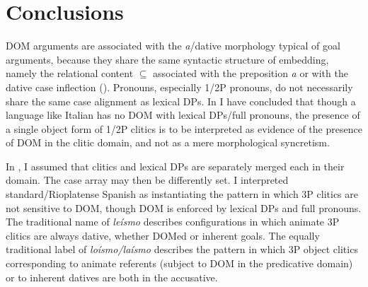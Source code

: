 \documentclass[output=paper,colorlinks,citecolor=brown,modfonts,nonflat]{langsci/langscibook}
\begin{document}
\section{Conclusions}\label{sec:manzini:4}
\largerpage[-1]
DOM arguments are associated with the \textit{a}/dative morphology typical of goal arguments, because they share the same syntactic structure of embedding, namely the relational content ${\subseteq}$ associated with the preposition \textit{a} or with the dative case inflection (). Pronouns, especially 1/2P pronouns, do not necessarily share the same case alignment as lexical DPs. In  I have concluded that though a language like Italian has no DOM with lexical DPs/full pronouns, the presence of a single object form of 1/2P clitics is to be interpreted as evidence of the presence of DOM in the clitic domain, and not as a mere morphological syncretism.

In , I assumed that clitics and lexical DPs are separately merged each in their domain. The case array may then be differently set. I interpreted standard/Rioplatense Spanish as instantiating the pattern in which 3P clitics are not sensitive to DOM, though DOM is enforced by lexical DPs and full pronouns. The traditional name of \textit{leísmo} describes configurations in which animate 3P clitics are always dative, whether DOMed or inherent goals. The equally traditional label of \textit{loísmo/laísmo} describes the pattern in which 3P object clitics corresponding to animate referents (subject to DOM in the predicative domain) or to inherent datives are both in the accusative.

\sloppy
\printbibliography[heading=subbibliography,notkeyword=this]
\end{document}
